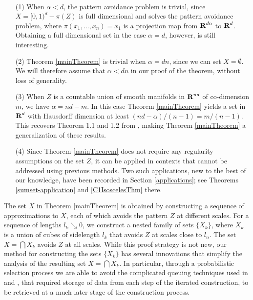 \begin{remarks}
	\
	\begin{enumerate}
		\item[(1)] When $\alpha < d$, the pattern avoidance problem is trivial, since $X = [0,1)^d - \pi(Z)$ is full dimensional and solves the pattern avoidance problem, where $\pi(x_1, \dots, x_n) = x_1$ is a projection map from $\operatorname{\mathbf{R}}^{dn}$ to $\operatorname{\mathbf{R}}^d$. Obtaining a full dimensional set in the case $\alpha = d$, however, is still interesting.

		\item[(2)] Theorem \ref{mainTheorem} is trivial when $\alpha = dn$, since we can set $X = \emptyset$. We will therefore assume that $\alpha < dn$ in our proof of the theorem, without loss of generality.

		\item[(3)] When $Z$ is a countable union of smooth manifolds in $\operatorname{\mathbf{R}}^{nd}$ of co-dimension $m$, we have $\alpha = nd - m$. In this case Theorem \ref{mainTheorem} yields a set in $\operatorname{\mathbf{R}}^d$ with Hausdorff dimension at least $(nd - \alpha)/(n-1) = m/(n-1)$. This recovers Theorem 1.1 and 1.2 from \cite{MalabikaRob}, making Theorem \ref{mainTheorem} a generalization of these results.

		\item[(4)] Since Theorem \ref{mainTheorem} does not require any regularity assumptions on the set $Z$, it can be applied in contexts that cannot be addressed using previous methods. Two such applications, new to the best of our knowledge, have been recorded in Section \ref{applications}; see Theorems \ref{sumset-application} and \ref{C1IsoscelesThm} there.
	\end{enumerate}
\end{remarks}

The set $X$ in Theorem \ref{mainTheorem} is obtained by constructing a sequence of approximations to $X$, each of which avoids the pattern $Z$ at different scales. For a sequence of lengths $l_k \searrow 0$, we construct a nested family of sets $\{X_k\}$, where $X_k$ is a union of cubes of sidelength $l_k$ that avoids $Z$ at scales close to $l_n$. The set $X=\bigcap X_k$ avoids $Z$ at all scales. While this proof strategy is not new, our method for constructing the sets $\{X_k\}$ has several innovations that simplify the analysis of the resulting set $X=\bigcap X_k$. In particular, through a probabilistic selection process we are able to avoid the complicated queuing techniques used in \cite{KeletiDimOneSet} and \cite{MalabikaRob}, that required storage of data from each step of the iterated construction, to be retrieved at a much later stage of the construction process.

